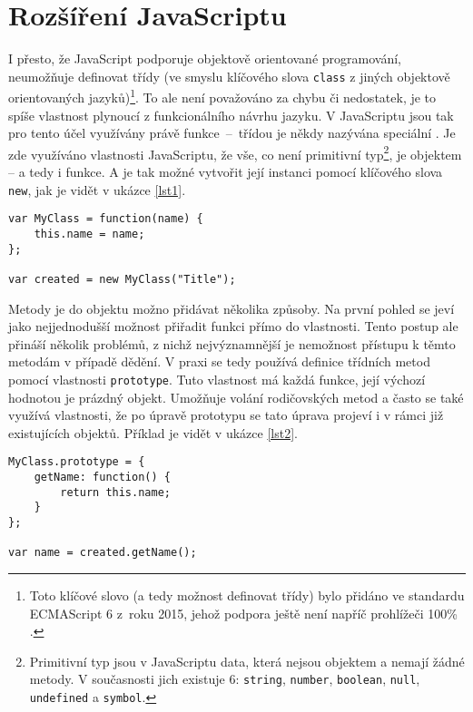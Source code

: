 \section{Rozšíření JavaScriptu}
I přesto, že JavaScript podporuje objektově orientované programování, neumožňuje definovat třídy (ve smyslu klíčového slova \texttt{class} z jiných objektově orientovaných jazyků)\footnote{Toto klíčové slovo (a tedy možnost definovat třídy) bylo přidáno ve standardu ECMAScript 6 \cite{classes} z~ro\-ku 2015, jehož podpora ještě není napříč prohlížeči 100\% \cite{es6}.}. To ale není považováno za chybu či nedostatek, je to spíše vlastnost plynoucí z funkcionálního návrhu jazyku. V JavaScriptu jsou tak pro tento účel využívány právě funk\-ce~--~tří\-dou je někdy nazývána speciální . Je zde využíváno vlastnosti JavaScriptu, že vše, co není primitivní typ\footnote{Primitivní typ jsou v JavaScriptu data, která nejsou objektem a nemají žádné metody. V současnosti jich existuje 6: \texttt{string}, \texttt{number}, \texttt{boolean}, \texttt{null}, \texttt{undefined} a \texttt{symbol}\cite{primitives}.}, je objektem -- a tedy i funkce. A je tak možné vytvořit její instanci pomocí klíčového slova \texttt{new}, jak je vidět v ukázce \ref{lst1}.

\begin{lstlisting}[float,floatplacement=h,caption={Vytváření instance},label=lst1]
var MyClass = function(name) {
	this.name = name;
};

var created = new MyClass("Title");
\end{lstlisting}

Metody je do objektu možno přidávat několika způsoby. Na první pohled se jeví jako nejjednodušší možnost přiřadit funkci přímo do vlastnosti. Tento postup ale přináší několik problémů, z nichž nejvýznamnější je nemožnost přístupu k těmto metodám v případě dědění. V praxi se tedy používá definice třídních metod pomocí vlastnosti \texttt{prototype}. Tuto vlastnost má každá funkce, její výchozí hodnotou je prázdný objekt. Umožňuje volání rodičovských metod a často se také využívá vlastnosti, že po úpravě prototypu se tato úprava projeví i v rámci již existujících objektů. Příklad je vidět v ukázce \ref{lst2}.

\begin{lstlisting}[caption={Ukázka využití prototypu},label=lst2]
MyClass.prototype = {
	getName: function() {
		return this.name;
	}
};

var name = created.getName();
\end{lstlisting}


